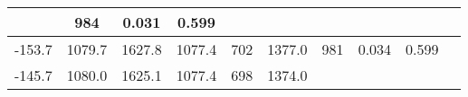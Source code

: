 \documentclass[a4paper,10pt]{article}
\begin{document}
\begin{longtable}{
     |
%    
    c|
%    
    c|
%    
    c|
%    
    c|
%    
    c|
%    
    c|
%    
    c|
%    
    c|
%    
    c|
%    
    c|
%    
    }
%        
        & 984
%        

%        

%        
        & 0.031
%        

%        

%        
        & 0.599
%        

%        
        \\
        \hline

        

%        

%        
        -153.7
%        

%        

%        
        & 1079.7
%        

%        

%        
        & 1627.8
%        

%        

%        
        & 1077.4
%        

%        

%        
        & 702
%        

%        

%        
        & 1377.0
%        

%        

%        
        & 981
%        

%        

%        
        & 0.034
%        

%        

%        
        & 0.599
%        

%        
        \\
        \hline

        

%        

%        
        -145.7
%        

%        

%        
        & 1080.0
%        

%        

%        
        & 1625.1
%        

%        

%        
        & 1077.4
%        

%        

%        
        & 698
%        

%        

%        
        & 1374.0
%        

%        


\end{longtable}
\end{document}
